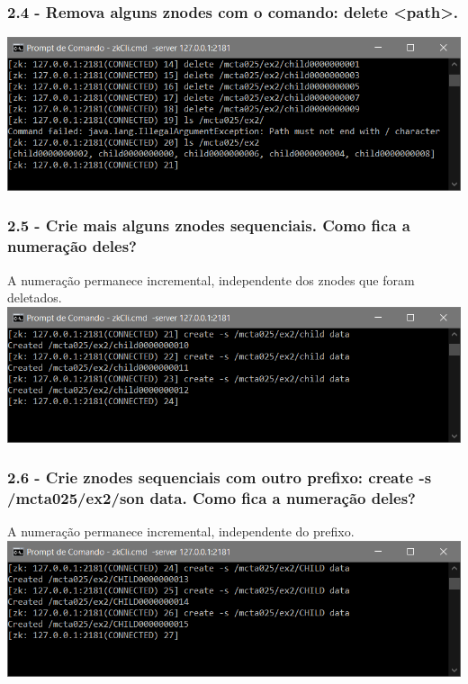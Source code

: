 \subsubsection{2.4 - Remova alguns znodes com o comando: delete <path>.}

\includegraphics{pratica3/prints/roteiro 2.4.PNG}

\subsubsection{2.5 - Crie mais alguns znodes sequenciais. Como fica a numeração deles?}
A numeração permanece incremental, independente dos znodes que foram deletados.
\newline
\includegraphics{pratica3/prints/roteiro 2.5.PNG}

\subsubsection{2.6 - Crie znodes sequenciais com outro prefixo: create -s
/mcta025/ex2/son data. Como fica a numeração deles?}
A numeração permanece incremental, independente do prefixo.
\newline
\includegraphics{pratica3/prints/roteiro 2.6.PNG}

